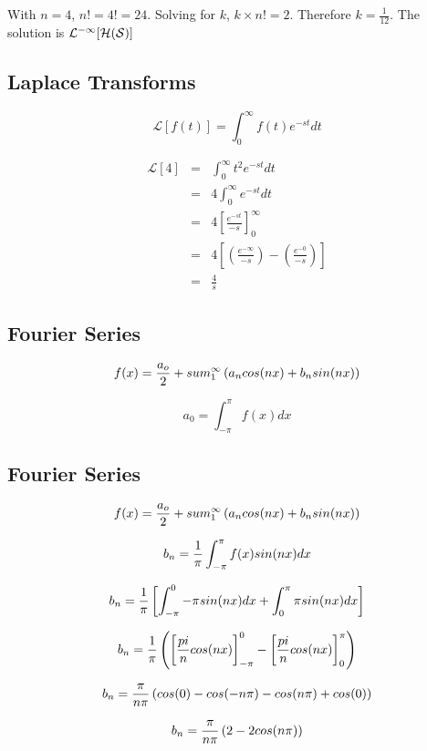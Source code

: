 \documentclass[12pt, a4paper]{article}
\begin{document}
With $n=4$, $n!= 4! = 24$. Solving for $k$, $k \times n! = 2$.
Therefore $k=\frac{1}{12}$. The solution is $\cal{L}^{-1}[H(S)]$

\newpage
\subsection*{Laplace Transforms}

\[ \mathcal{L}[f(t)] =  \int^{\infty}_0 f(t) e^{-st}dt \]

\begin{eqnarray}
\mathcal{L}[4] &=&  \int^{\infty}_0 t^2 e^{-st}dt \\
&=&  4 \int^{\infty}_0 e^{-st}dt \\
&=&  4 \left[ \frac{e^{-st}}{-s} \right]^{\infty}_0 \\
&=&  4 \left[ \left(\frac{e^{-\infty}}{-s} \right) -  \left(\frac{e^{-0}}{-s} \right)\right]\\
&=&  \frac{4}{s}
\end{eqnarray}
\subsection*{Fourier Series}

\[ f(x) =  {a_o \over 2} + sum^{\infty}_1 \left( a_ncos(nx) + b_nsin(nx) \right) \]

\[ a_0 = \int^{\pi}_{-\pi}f(x) dx  \]


\subsection*{Fourier Series}

\[ f(x) =  {a_o \over 2} + sum^{\infty}_1 \left( a_ncos(nx) + b_nsin(nx) \right) \]

\[ b_n = {1 \over \pi}\int^{\pi}_{-\pi}f(x) sin(nx)dx  \]


\[ b_n = {1 \over \pi} \left[\int^{0}_{-\pi}-\pi sin(nx)dx + \int^{\pi}_{0}\pi sin(nx)dx  \right] \]


\[ b_n = {1 \over \pi}  \left( \left[ \frac{pi}{n}cos(nx) \right]^0_{-\pi} - \left[ \frac{pi}{n}cos(nx) \right]^{\pi}_0 \right) \]

\[ b_n = {\pi \over n\pi} \left( cos(0) - cos(-n\pi) -  cos(n\pi) + cos(0) \right) \]

\[b_n = { \pi \over n\pi} \left( 2 - 2cos(n\pi)  \right) \]

\end{document}
